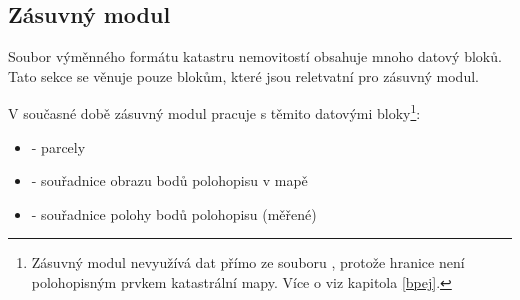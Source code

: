 \subsection{Zásuvný modul}
\label{datove_bloky_zasuvny_modul}

Soubor výměnného formátu katastru nemovitostí obsahuje mnoho datový bloků. Tato sekce se věnuje pouze blokům, které jsou reletvatní pro zásuvný modul.

V současné době zásuvný modul pracuje s těmito datovými bloky\footnote{Zásuvný modul nevyužívá dat  přímo ze souboru , protože hranice  není polohopisným prvkem katastrální mapy. Více o  viz kapitola \ref{bpej}.}:

	\begin{itemize}[leftmargin=1.5cm]
		\item {} - parcely
		\item {} - souřadnice obrazu bodů polohopisu v mapě
		\item {} - souřadnice polohy bodů polohopisu (měřené)
	\end{itemize}

